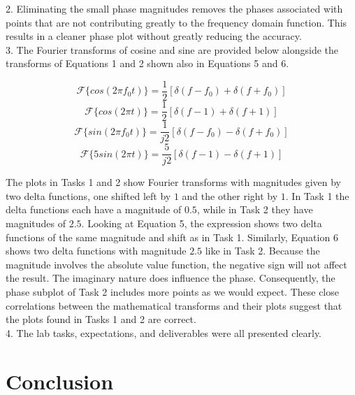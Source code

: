 \documentclass[12pt]{report}
\begin{document}
2. Eliminating the small phase magnitudes removes the phases associated with points that are not contributing greatly to the frequency domain function. This results in a cleaner phase plot without greatly reducing the accuracy. \\

3. The Fourier transforms of cosine and sine are provided below alongside the transforms of Equations 1 and 2 shown also in Equations 5 and 6. 

\begin{equation*}
	\mathcal{F}\{cos(2\pi f_0t)\} = \frac{1}{2}[\delta(f - f_0) + \delta(f + f_0)]
\end{equation*}
\begin{equation*}
	\mathcal{F}\{cos(2\pi t)\} = \frac{1}{2}[\delta(f - 1) + \delta(f + 1)] 
\end{equation*}
\begin{equation*}
	\mathcal{F}\{sin(2\pi f_0t)\} = \frac{1}{j2}[\delta(f - f_0) - \delta(f + f_0)]
\end{equation*}
\begin{equation*}
	\mathcal{F}\{5sin(2\pi t)\} = \frac{5}{j2}[\delta(f - 1) - \delta(f + 1)]
\end{equation*}

The plots in Tasks 1 and 2 show Fourier transforms with magnitudes given by two delta functions, one shifted left by $ 1 $ and the other right by $ 1 $. In Task 1 the delta functions each have a magnitude of $ 0.5 $, while in Task 2 they have magnitudes of $ 2.5 $. Looking at Equation 5, the expression shows two delta functions of the same magnitude and shift as in Task 1. Similarly, Equation 6 shows two delta functions with magnitude $ 2.5 $ like in Task 2. Because the magnitude involves the absolute value function, the negative sign will not affect the result. The imaginary nature does influence the phase. Consequently, the phase subplot of Task 2 includes more points as we would expect. These close correlations between the mathematical transforms and their plots suggest that the plots found in Tasks 1 and 2 are correct. \\

4. The lab tasks, expectations, and deliverables were all presented clearly. \\

\section{Conclusion}
\end{document}
